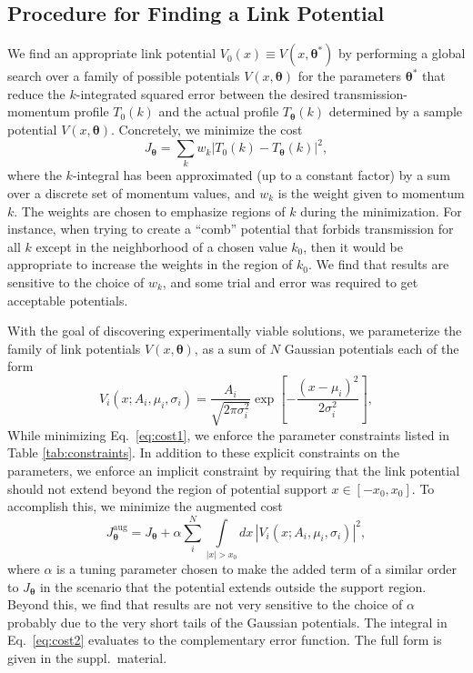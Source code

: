 \documentclass[twocolumn,amsmath,amssymb,showpacs,prl,superscriptaddress,aps]{revtex4-1}
\begin{document}
\subsection{Procedure for Finding a Link Potential}\label{sec:procedure_link}
We find an appropriate link potential $V_0(x) \equiv V(x,\bm{\theta}^*)$ by performing a global search over a family of possible potentials $V(x,\bm{\theta})$ for the parameters $\bm{\theta}^*$ that reduce the $k$-integrated squared error between the desired transmission-momentum profile $T_0(k)$ and the actual profile $T_{\bm\theta}(k)$ determined by a sample potential $V(x, \bm{\theta})$. Concretely, we minimize the cost
\begin{equation}\label{eq:cost1}
  J_{\bm{\theta}} = \sum_kw_k\left|T_0(k) - T_{\mathbf{\theta}}(k)\right|^2,
\end{equation}
where the $k$-integral has been approximated (up to a constant factor) by a sum over a discrete set of momentum values, and $w_k$ is the weight given to momentum $k$. The weights are chosen to emphasize regions of $k$ during the minimization. For instance, when trying to create a ``comb'' potential that forbids transmission for all $k$ except in the neighborhood of a chosen value $k_0$, then it would be appropriate to increase the weights in the region of $k_0$. We find that results are sensitive to the choice of $w_k$, and some trial and error was required to get acceptable potentials. 

With the goal of discovering experimentally viable solutions, we parameterize the family of link potentials $V(x, \bm{\theta})$, as a sum of $N$ Gaussian potentials each of the form
\begin{equation}\label{eq:V-param}
V_i(x; A_i, \mu_i, \sigma_i) = \frac{A_i}{\sqrt{2\pi\sigma_i^2}}\exp\left[{-\frac{(x-\mu_i)^2}{2\sigma_i^2}}\right],
\end{equation}
While minimizing Eq.~\eqref{eq:cost1}, we enforce the parameter constraints listed in Table \ref{tab:constraints}. In addition to these explicit constraints on the parameters, we enforce an implicit constraint by requiring that the link potential should not extend beyond the region of potential support $x\in[-x_0,x_0]$. To accomplish this, we minimize the augmented cost
\begin{equation}\label{eq:cost2}
  J_{\bm{\theta}}^{\mathrm{aug}} = J_{\bm{\theta}} + \alpha \sum_i^N\int\limits_{|x|>x_0}dx\,|V_i(x; A_i,\mu_i,\sigma_i)|^2,
\end{equation}
where $\alpha$ is a tuning parameter chosen to make the added term of a similar order to $J_{\mathbf{\theta}}$ in the scenario that the potential extends outside the support region. Beyond this, we find that results are not very sensitive to the choice of $\alpha$ probably due to the very short tails of the Gaussian potentials. The integral in Eq.~\eqref{eq:cost2} evaluates to the complementary error function. The full form is given in the suppl.~material. 
\end{document}
